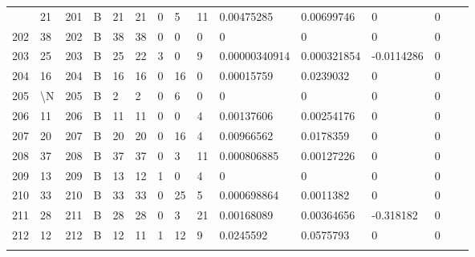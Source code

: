\begin{longtable}{lllllllllllllll}
\begin{comment}
	201 & 21                & 201 & B   & 21                & 21                & 0                 & 5    & 11         & 0.00475285     & 0.00699746     & 0             & 0            \\
	202 & 38                & 202 & B   & 38                & 38                & 0                 & 0    & 0          & 0              & 0              & 0             & 0            \\
	203 & 25                & 203 & B   & 25                & 22                & 3                 & 0    & 9          & 0.00000340914  & 0.000321854    & -0.0114286    & 0            \\
	204 & 16                & 204 & B   & 16                & 16                & 0                 & 16   & 0          & 0.00015759     & 0.0239032      & 0             & 0            \\
	205 & \textbackslash{}N & 205 & B   & 2                 & 2                 & 0                 & 6    & 0          & 0              & 0              & 0             & 0            \\
	206 & 11                & 206 & B   & 11                & 11                & 0                 & 0    & 4          & 0.00137606     & 0.00254176     & 0             & 0            \\
	207 & 20                & 207 & B   & 20                & 20                & 0                 & 16   & 4          & 0.00966562     & 0.0178359      & 0             & 0            \\
	208 & 37                & 208 & B   & 37                & 37                & 0                 & 3    & 11         & 0.000806885    & 0.00127226     & 0             & 0            \\
	209 & 13                & 209 & B   & 13                & 12                & 1                 & 0    & 4          & 0              & 0              & 0             & 0            \\
	210 & 33                & 210 & B   & 33                & 33                & 0                 & 25   & 5          & 0.000698864    & 0.0011382      & 0             & 0            \\
	211 & 28                & 211 & B   & 28                & 28                & 0                 & 3    & 21         & 0.00168089     & 0.00364656     & -0.318182     & 0            \\
	212 & 12                & 212 & B   & 12                & 11                & 1                 & 12   & 9          & 0.0245592      & 0.0575793      & 0             & 0            \\

\end{comment}
\end{longtable}
